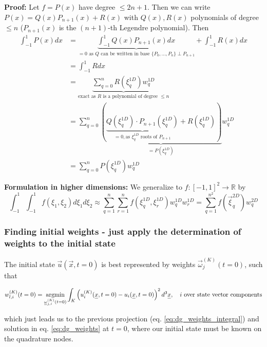 \textbf{Proof: } Let $f = P(x)$ have degree $\leq 2n+1$. Then we can write
$P(x) = Q(x) P_{n+1}(x) + R(x)$ with $Q(x), R(x)$ polynomials of degree $\leq n$ ($P_{n+1}(x)$ is the $(n+1)$-th Legendre polynomial).
Then 
\begin{equation}
    \begin{aligned}
        \int_{-1}^{1} P(x) d x &=\underbrace{\int_{-1}^{1} Q(x) P_{n+1}(x) d x}_{=0\text{ as } Q \text{ can be written in base } \{P_0,\dots,P_n\} \perp P_{n+1}}+\int_{-1}^{1} R(x) d x \\
        &=\int_{-1}^{1} R d x \\
        &=\underbrace{\sum_{q=0}^{n} R\left(\xi_{q}^{1 D}\right) w_{q}^{1 D}}_{\text{exact as } R \text{ is a polynomial of degree } \leq n} \\
        &=\sum_{q=0}^{n} \underbrace{\left(\underbrace{Q(\xi_{q}^{1 D}) \cdot P_{n+1}(\xi_{q}^{1 D})}_{=0, \text{as } \xi_{q}^{1 D} \text{ roots of } P_{n+1}} + R\left(\xi_{q}^{1 D}\right)\right)}_{=P(\xi_{q}^{1 D})} w_{q}^{1 D} \\
        &= \sum_{q=0}^{n} P(\xi_{q}^{1 D}) w_{q}^{1 D}
    \end{aligned}
\end{equation}

\textbf{Formulation in higher dimensions: } We generalize to $f: [-1,1]^2 \rightarrow \mathbb{R}$ by
\begin{equation}
    \int_{-1}^1 \int_{-1}^1 f\left(\xi_1, \xi_2\right) d \xi_1 d \xi_2 \approx \sum_{q=1}^n \sum_{r=1}^n f\left(\xi_q^{1 D}, \xi_r^{1 D}\right) w_q^{1 D} w_r^{1 D}=\sum_{q=1}^{n^2} f\left(\vec{\xi}_q^{2 D}\right) w_q^{2 D}
\end{equation}

\subsubsection{Finding initial weights - just apply the determination of weights to the initial state}
The initial state $\vec{u}(\vec{x}, t=0)$ is best represented by weights $\vec{\omega}_j^{(K)}(t=0)$, such that

\begin{equation}
    w_{l,i}^{(K)}(t=0)= \argmin_{\vec{\omega}_{j,i}^{(K)}(t=0)} \int_{K} \left( u_i^{(K)}(\vec{x}, t=0) - u_i(\vec{x}, t=0) \right)^2 d^3 \vec{x}, \quad i \text{ over state vector components}
\end{equation}

which just leads us to the previous projection (eq. \ref{eq:dg_weights_integral}) and solution in eq. \ref{eq:dg_weights} at $t=0$, where
our initial state must be known on the quadrature nodes.

